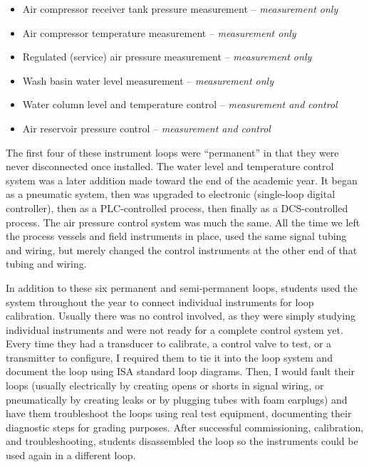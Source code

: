 \begin{itemize}
\item Air compressor receiver tank pressure measurement -- \textit{measurement only}
\item Air compressor temperature measurement -- \textit{ measurement only}
\item Regulated (service) air pressure measurement -- \textit{measurement only}
\item Wash basin water level measurement -- \textit{measurement only}
\item Water column level and temperature control -- \textit{measurement and control}
\item Air reservoir pressure control -- \textit{measurement and control}
\end{itemize}

The first four of these instrument loops were ``permanent'' in that they were never disconnected once installed.  The water level and temperature control system was a later addition made toward the end of the academic year.  It began as a pneumatic system, then was upgraded to electronic (single-loop digital controller), then as a PLC-controlled process, then finally as a DCS-controlled process.  The air pressure control system was much the same.  All the time we left the process vessels and field instruments in place, used the same signal tubing and wiring, but merely changed the control instruments at the other end of that tubing and wiring.
 
In addition to these six permanent and semi-permanent loops, students used the system throughout the year to connect individual instruments for loop calibration.  Usually there was no control involved, as they were simply studying individual instruments and were not ready for a complete control system yet.  Every time they had a transducer to calibrate, a control valve to test, or a transmitter to configure, I required them to tie it into the loop system and document the loop using ISA standard loop diagrams.  Then, I would fault their loops (usually electrically by creating opens or shorts in signal wiring, or pneumatically by creating leaks or by plugging tubes with foam earplugs) and have them troubleshoot the loops using real test equipment, documenting their diagnostic steps for grading purposes.  After successful commissioning, calibration, and troubleshooting, students disassembled the loop so the instruments could be used again in a different loop.

